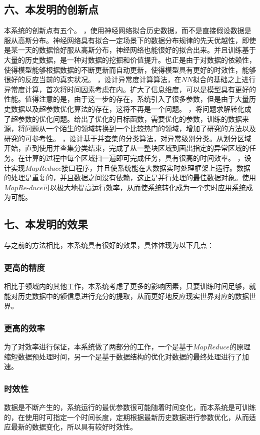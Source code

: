 \documentclass[a4paper, UTF8]{article}
\begin{document}
\begin{CJK}{UTF8}{gbsn}
\begin{appendix}
\subsection*{六、本发明的创新点}
本系统的创新点有五个。
，使用神经网络拟合历史数据，而不是直接假设数据是服从高斯分布。神经网络具有拟合一定场景下的数据分布规律的先天优越性，即使是某一天的数据恰好服从高斯分布，神经网络也能很好的拟合出来。并且训练基于大量的历史数据，是一种对数据的挖掘和价值提升。也正是由于对数据的依赖性，使得模型能够根据数据的不断更新而自动更新，使得模型具有更好的时效性，能够很好的反应当前的真实状况。
，设计异常度计算算法，在$NN$拟合的基础之上进行异常度计算，首次将时间因素考虑在内。扩大了信息维度，可以是模型具有更好的性能。值得注意的是，由于这一步的存在，系统引入了很多参数，但是由于大量历史数据以及超参数优化算法的存在，这将不再是一个问题。
，将问题求解转化成了超参数的优化问题。给出了优化的目标函数，需要优化的参数，训练的数据来源，将问题从一个陌生的领域转换到一个比较热门的领域，增加了研究的方法以及研究的可参考性。
，设计基于并查集的分类算法，对异常级别分类。从划分区域开始，直到使用并查集分类结束，完成了从一整块区域到画出指定的异常区域的任务。在计算的过程中每个区域扫一遍即可完成任务，具有很高的时间效率。
，设计实现$MapReduce$接口程序，并且使系统能在大数据实时处理框架上运行。数据的处理是重复的，并且数据之间没有依赖，这正是并行处理的最佳数据对象。使用$MapRe$-$duce$可以极大地提高运行效率，从而使系统转化成为一个实时应用系统成为可能。
\subsection*{七、本发明的效果}
与之前的方法相比，本系统具有很好的效果，具体体现为以下几点：
\subsubsection*{更高的精度}
相比于领域内的其他工作，本系统考虑了更多的影响因素，只要训练时间足够，就能对历史数据中的额信息进行充分的提取，从而更好地反应现实世界对应的数据世界。
\subsubsection*{更高的效率}
为了对效率进行保证，本系统做了两部分的工作，一个是基于$MapReduce$的原理缩短数据预处理时间，另一个是基于数据结构的优化对数据的最终处理进行了加速。
\subsubsection*{时效性}
数据是不断产生的，系统运行的最优参数很可能随着时间变化，而本系统是可训练的，在使用时可指定一个时间长度，定期根据最新历史数据进行参数优化，从而适应最新的数据变化，所以具有较好时效性。

\end{appendix}
\end{CJK}
\end{document}
